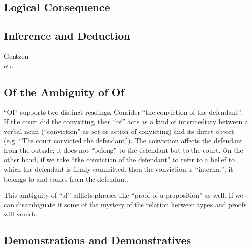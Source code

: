 \subsection{Logical Consequence}
\label{subs:logconseq}

\cite{prawitz_logical_2005}

\cite{prawitz_meaning_2006}

\cite{prawitz_inference_2009}

\cite{prawitz_epistemic_2011}

\cite{prawitz_truth_epistemic}

\subsection{Inference and Deduction}
\label{sect:infdeduc}

\begin{description}
\item [Gentzen]
\item [etc]
\end{description}

\subsection{Of the Ambiguity of Of}
\label{subs:ofofof}

``Of'' supports two distinct readings.  Consider ``the conviction of
the defendant''.  If the court did the convicting, then ``of'' acts as
a kind of intermediary between a verbal noun (``conviction'' as act or
action of convicting) and its direct object (e.g. ``The court
convicted the defendant'').  The conviction affects the defendant from
the outside; it does not ``belong'' to the defendant but to the court.
On the other hand, if we take ``the conviction of the defendant'' to
refer to a belief to which the defendant is firmly committed, then the
conviction is ``internal''; it belongs to and comes from the
defendant.

This ambiguity of ``of'' afflicts phrases like ``proof of a
proposition'' as well.  If we can disambiguate it some of the mystery
of the relation between types and proofs will vanish.

\subsection{Demonstrations and Demonstratives}
\label{subs:}

